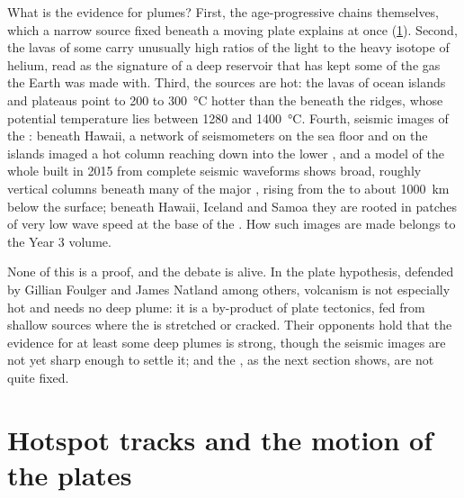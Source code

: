 What is the evidence for plumes? First, the age-progressive chains themselves,
which a narrow source fixed beneath a moving plate explains at once
(\cref{sec:b1:hotspots:tracks}). Second, the lavas of some  carry
unusually high ratios of the light to the heavy isotope of helium, read as the
signature of a deep reservoir that has kept some of the gas the Earth was made
with. Third, the sources are hot: the lavas of ocean islands and plateaus point
to  200 to \qty{300}{\celsius} hotter than the  beneath the ridges,
whose potential temperature lies between 1280 and \qty{1400}{\celsius}. Fourth,
seismic images of the : beneath Hawaii, a network of seismometers on the
sea floor and on the islands imaged a hot column reaching down into the lower
, and a model of the whole  built in 2015 from complete seismic
waveforms shows broad, roughly vertical columns beneath many of the major
, rising from the  to about \qty{1000}{km} below
the surface; beneath Hawaii, Iceland and Samoa they are rooted in patches of
very low wave speed at the base of the . How such images are made belongs
to the Year 3 volume.

None of this is a proof, and the debate is alive. In the plate hypothesis,
defended by Gillian Foulger and James Natland among others,  volcanism
is not especially hot and needs no deep plume: it is a by-product of plate
tectonics, fed from shallow sources where the  is stretched or
cracked. Their opponents hold that the evidence for at least some deep plumes
is strong, though the seismic images are not yet sharp enough to settle it; and
the , as the next section shows, are not quite fixed.

\section{Hotspot tracks and the motion of the plates}\label{sec:b1:hotspots:tracks}

